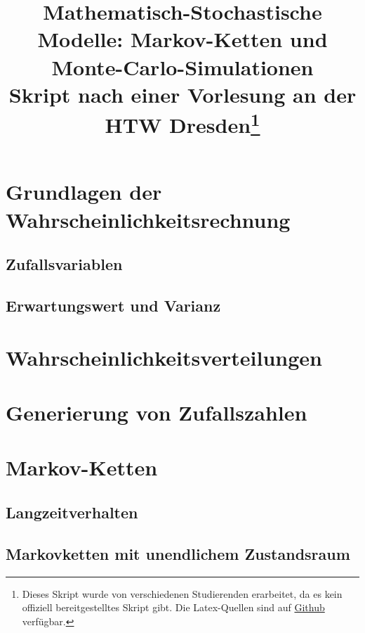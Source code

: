\documentclass{report}
\title{%
\huge\textbf{Mathematisch-Stochastische Modelle: Markov-Ketten und Monte-Carlo-Simulationen} \\
[2em]\large Skript nach einer Vorlesung an der HTW Dresden\thanks{Dieses Skript
wurde von verschiedenen Studierenden erarbeitet, da es kein offiziell
bereitgestelltes Skript gibt. Die Latex-Quellen sind auf
\href{https://github.com/burrscurr/msm}{Github} verfügbar.}
}
\theoremstyle{lemmastyle}
\begin{document}
  \maketitle

  \tableofcontents

  \chapter{Grundlagen der Wahrscheinlichkeitsrechnung}
    
    \section{Zufallsvariablen}
    
    \section{Erwartungswert und Varianz}
    

  \chapter{Wahrscheinlichkeitsverteilungen}
    

  \chapter{Generierung von Zufallszahlen}
    

  

  \chapter{Markov-Ketten}
    
    \section{Langzeitverhalten}
    
    \section{Markovketten mit unendlichem Zustandsraum}
    

  \printbibliography
\end{document}
